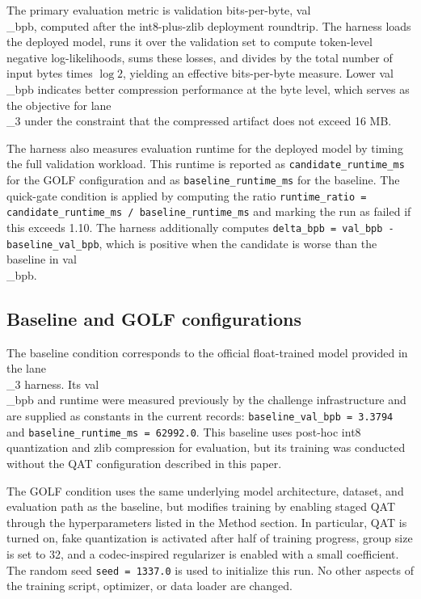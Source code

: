 \documentclass{article}
\begin{document}
The primary evaluation metric is validation bits-per-byte, val\\_bpb, computed after the int8-plus-zlib deployment roundtrip. The harness loads the deployed model, runs it over the validation set to compute token-level negative log-likelihoods, sums these losses, and divides by the total number of input bytes times \(\log 2\), yielding an effective bits-per-byte measure. Lower val\\_bpb indicates better compression performance at the byte level, which serves as the objective for lane\\_3 under the constraint that the compressed artifact does not exceed 16 MB.

The harness also measures evaluation runtime for the deployed model by timing the full validation workload. This runtime is reported as \texttt{candidate\_runtime\_ms} for the GOLF configuration and as \texttt{baseline\_runtime\_ms} for the baseline. The quick-gate condition is applied by computing the ratio \texttt{runtime\_ratio = candidate\_runtime\_ms / baseline\_runtime\_ms} and marking the run as failed if this exceeds 1.10. The harness additionally computes \texttt{delta\_bpb = val\_bpb - baseline\_val\_bpb}, which is positive when the candidate is worse than the baseline in val\\_bpb.

\subsection{Baseline and GOLF configurations}

\label{sec:baseline_and_golf_configurations}

The baseline condition corresponds to the official float-trained model provided in the lane\\_3 harness. Its val\\_bpb and runtime were measured previously by the challenge infrastructure and are supplied as constants in the current records: \texttt{baseline\_val\_bpb = 3.3794} and \texttt{baseline\_runtime\_ms = 62992.0}. This baseline uses post-hoc int8 quantization and zlib compression for evaluation, but its training was conducted without the QAT configuration described in this paper.

The GOLF condition uses the same underlying model architecture, dataset, and evaluation path as the baseline, but modifies training by enabling staged QAT through the hyperparameters listed in the Method section. In particular, QAT is turned on, fake quantization is activated after half of training progress, group size is set to 32, and a codec-inspired regularizer is enabled with a small coefficient. The random seed \texttt{seed = 1337.0} is used to initialize this run. No other aspects of the training script, optimizer, or data loader are changed.
\end{document}
